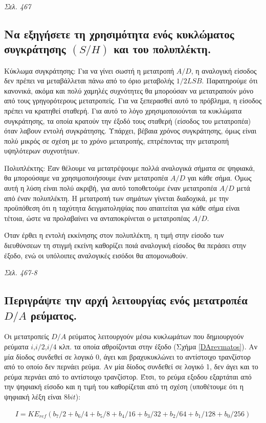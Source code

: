 \documentclass{article}
\begin{document}
\emph{Σελ. 467}

\subsection{Να εξηγήσετε τη χρησιμότητα ενός κυκλώματος συγκράτησης $(S/H)$ και του πολυπλέκτη.}
Κύκλωμα συγκράτησης: Για να γίνει σωστή η μετατροπή $A/D$, η αναλογική είσοδος δεν πρέπει να μεταβάλλεται πάνω από το όριο μεταβολής $1/2LSB$. Παρατηρούμε ότι κανονικά,
ακόμα και πολύ χαμηλές συχνότητες θα μπορούσαν να μετατραπούν μόνο από τους γρηγορότερους μετατροπείς. Για να ξεπερασθεί αυτό το πρόβλημα, η είσοδος πρέπει να κρατηθεί σταθερή. Για
αυτό το λόγο χρησιμοποιούνται τα κυκλώματα συγκράτησης, τα οποία κρατούν την έξοδό τους σταθερή (είσοδος του μετατροπέα) όταν λαβουν εντολή συγκράτησης. Υπάρχει, 
βέβαια χρόνος συγκράτησης, όμως είναι πολύ μικρός σε σχέση με το χρόνο μετατροπής, επτρέποντας την μετατροπή υψηλότερων συχνοτήτων.

Πολυπλέκτης: Έαν θέλουμε να μετατρέψουμε πολλά αναλογικά σήματα σε ψηφιακά, θα μπορούσαμε να χρησιμοποιήσουμε έναν μετατροπέα $A/D$ γαι κάθε σήμα. Όμως αυτή η λύση είναι
πολύ ακριβή, για αυτό τοποθετούμε έναν μετατροπέα $A/D$ μετά από έναν πολυπλέκτη. Η μετατροπή των σημάτων γίνεται διαδοχικά, με την προϋπόθεση ότι η ταχύτητα δειγματοληψίας που
απαιτείται για κάθε σήμα είναι τέτοια, ώστε να προλαβαίνει να ανταποκρίνεται ο μετατροπέας $A/D$.

Όταν έρθει η εντολή εκκίνησης στον πολυπλέκτη, η τιμή στην είσοδο των διευθύνσεων τη στιγμή εκείνη καθορίζει ποιά αναλογική είσοδος θα περάσει στην έξοδο, ενώ οι 
υπόλοιπες αναλογικές εισόδοι θα απομονωθούν.

\emph{Σελ. 467-8}

\subsection{Περιγράψτε την αρχή λειτουργίας ενός μετατροπέα $D/A$ ρεύματος.}
Οι μετατροπείς $D/A$ ρεύματος λειτουργούν μέσω κυκλωμάτων που δημιουργούν ρεύματα $i$,$i/2$,$i/4$ κλπ. τα οποία αθροίζονται στην έξοδο (Σχήμα \ref{DArevmatos}). Αν μία δίοδος συνδεθεί σε λογικό 0, άγει και 
βραχυκυκλώνει το αντίστοιχο τρανζίστορ από το οποίο δεν περνάει ρεύμα. Αν μία δίοδος συνδεθεί σε λογικό 1, δεν άγει και το ρεύμα περνάει από το αντίστοιχο τρανζίστορ. Έτσι, το 
ρεύμα εξοδου εξαρτάται από την ψηφιακή είσοδο και η τιμή του καθορίζεται από τη σχέση (υποθέτουμε ότι η ψηφιακή λέξη είναι $8 bit$):

\begin{align*}
    I = K E_{ref} \left( b_7/2 + b_6/4 + b_5/8 + b_4/16 +b_3/32 + b_2/64 + b_1/128 + b_0/256 \right)
\end{align*}
\end{document}
